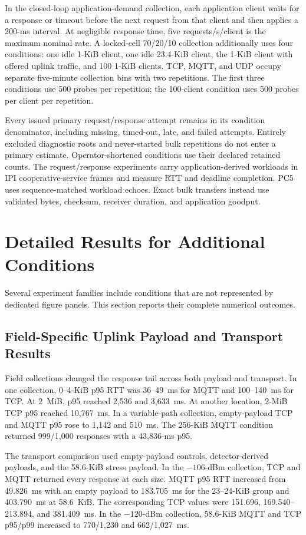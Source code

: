 In the closed-loop application-demand collection, each application client waits
for a response or timeout before the next
request from that client and then applies a 200-ms interval. At negligible
response time, five requests/s/client is the maximum nominal rate. A
locked-cell 70/20/10 collection additionally uses four conditions: one idle 1-KiB client,
one idle 23.4-KiB client, the 1-KiB client with offered uplink traffic, and 100
1-KiB clients. TCP, MQTT, and UDP occupy separate five-minute collection bins
with two repetitions. The first three conditions use 500 probes per repetition;
the 100-client condition uses 500 probes per client per repetition.

Every issued primary request/response attempt remains in its condition
denominator, including missing, timed-out, late, and failed attempts. Entirely
excluded diagnostic roots and never-started bulk repetitions do not enter a
primary estimate. Operator-shortened conditions use their declared retained
counts. The request/response experiments carry application-derived workloads
in IPI cooperative-service frames and measure RTT and deadline completion.
PC5 uses sequence-matched workload echoes. Exact bulk transfers instead use
validated bytes, checksum, receiver duration, and application goodput.

\section{Detailed Results for Additional Conditions}
\label{app:detailed-results}

Several experiment families include conditions that are not represented by
dedicated figure panels. This section reports their complete numerical
outcomes.

\subsection{Field-Specific Uplink Payload and Transport Results}

Field collections changed the response tail across both payload and transport.
In one collection, 0--4-KiB p95 RTT was 36--49~ms for MQTT and 100--140~ms for
TCP. At 2~MiB, p95 reached 2,536 and 3,633~ms. At another location, 2-MiB TCP
p95 reached 10,767~ms. In a variable-path collection, empty-payload TCP and
MQTT p95 rose to 1,142 and 510~ms. The 256-KiB MQTT condition returned
999/1,000 responses with a 43,836-ms p95.

The transport comparison used empty-payload controls, detector-derived
payloads, and the 58.6-KiB stress payload. In the $-106$-dBm collection, TCP and
MQTT returned every response at each size. MQTT p95 RTT increased from
49.826~ms with an empty payload to 183.705~ms for the 23--24-KiB group and
403.790~ms at 58.6~KiB. The corresponding TCP values were 151.696,
169.540--213.894, and 381.409~ms. In the $-120$-dBm collection, 58.6-KiB MQTT
and TCP p95/p99 increased to 770/1,230 and 662/1,027~ms.

